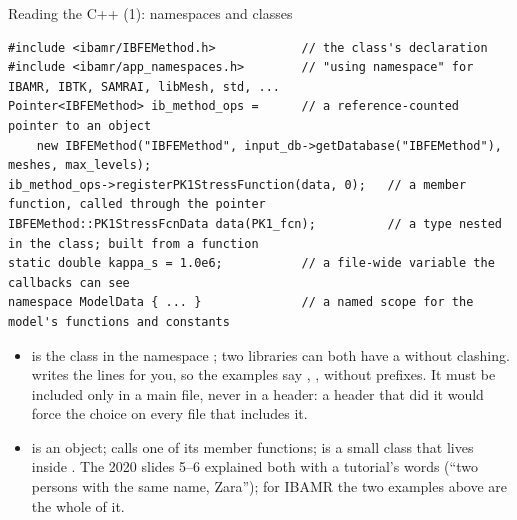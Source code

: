\documentclass[aspectratio=169,11pt]{beamer}
\begin{document}
\begin{frame}[fragile]{Reading the C++ (1): namespaces and classes}
\label{fr:cpp}
\footnotesize
\begin{lstlisting}[style=cpptiny]
#include <ibamr/IBFEMethod.h>            // the class's declaration
#include <ibamr/app_namespaces.h>        // "using namespace" for IBAMR, IBTK, SAMRAI, libMesh, std, ...
Pointer<IBFEMethod> ib_method_ops =      // a reference-counted pointer to an object
    new IBFEMethod("IBFEMethod", input_db->getDatabase("IBFEMethod"), meshes, max_levels);
ib_method_ops->registerPK1StressFunction(data, 0);   // a member function, called through the pointer
IBFEMethod::PK1StressFcnData data(PK1_fcn);          // a type nested in the class; built from a function
static double kappa_s = 1.0e6;           // a file-wide variable the callbacks can see
namespace ModelData { ... }              // a named scope for the model's functions and constants
\end{lstlisting}
\begin{itemize}
  \item {}  is the class  in the namespace ; two libraries can both have a  without clashing.  writes the  lines for you, so the examples say , ,  without prefixes. It must be included only in a main file, never in a header: a header that did it would force the choice on every file that includes it.
  \item {}  is an object; \code{->} calls one of its member functions;  is a small class that lives inside . The 2020 slides 5--6 explained both with a tutorial's words (``two persons with the same name, Zara''); for IBAMR the two examples above are the whole of it.
\end{itemize}
\end{frame}
\end{document}
